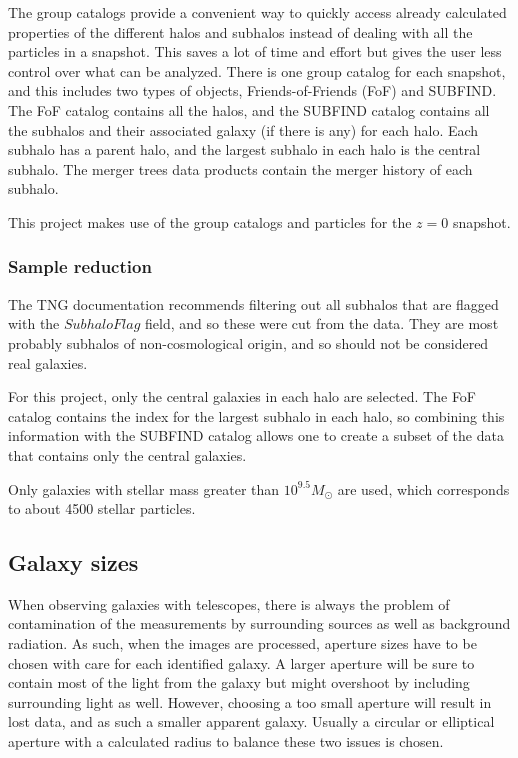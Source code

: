 The group catalogs provide a convenient way to quickly access already calculated properties of the different halos and subhalos instead of dealing with all the particles in a snapshot. This saves a lot of time and effort but gives the user less control over what can be analyzed. There is one group catalog for each snapshot, and this includes two types of objects, Friends-of-Friends (FoF) and SUBFIND. The FoF catalog contains all the halos, and the SUBFIND catalog contains all the subhalos and their associated galaxy (if there is any) for each halo. Each subhalo has a parent halo, and the largest subhalo in each halo is the central subhalo. The merger trees data products contain the merger history of each subhalo.

This project makes use of the group catalogs and particles for the $z = 0$ snapshot.

\subsubsection{Sample reduction}

The TNG documentation recommends filtering out all subhalos that are flagged with the $SubhaloFlag$ field, and so these were cut from the data. They are most probably subhalos of non-cosmological origin, and so should not be considered real galaxies.

For this project, only the central galaxies in each halo are selected. The FoF catalog contains the index for the largest subhalo in each halo, so combining this information with the SUBFIND catalog allows one to create a subset of the data that contains only the central galaxies.

Only galaxies with stellar mass greater than $10^{9.5} M_{\odot}$ are used, which corresponds to about 4500 stellar particles.

\subsection{Galaxy sizes}
When observing galaxies with telescopes, there is always the problem of contamination of the measurements by surrounding sources as well as background radiation. As such, when the images are processed, aperture sizes have to be chosen with care for each identified galaxy. A larger aperture will be sure to contain most of the light from the galaxy but might overshoot by including surrounding light as well. However, choosing a too small aperture will result in lost data, and as such a smaller apparent galaxy. Usually a circular or elliptical aperture with a calculated radius to balance these two issues is chosen.


